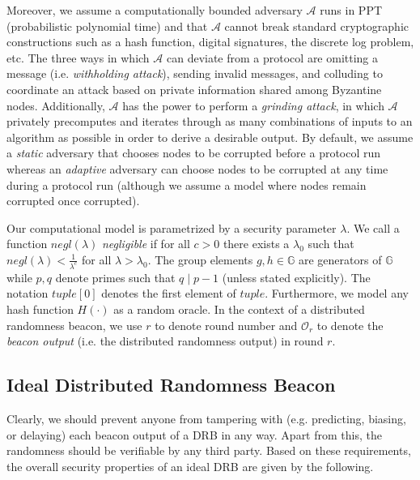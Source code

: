 \documentclass[letterpaper,twocolumn,10pt]{article}
\theoremstyle{definition}
\theoremstyle{remark}
\begin{document}
Moreover, we assume a computationally bounded adversary $\mathcal{A}$ runs in PPT (probabilistic polynomial time) and that $\mathcal{A}$ cannot break standard cryptographic constructions such as a hash function, digital signatures, the discrete log problem, etc. The three ways in which $\mathcal{A}$ can deviate from a protocol are omitting a message (i.e. \textit{withholding attack}), sending invalid messages, and colluding to coordinate an attack based on private information shared among Byzantine nodes. Additionally, $\mathcal{A}$ has the power to perform a \textit{grinding attack}, in which $\mathcal{A}$ privately precomputes and iterates through as many combinations of inputs to an algorithm as possible in order to derive a desirable output. By default, we assume a \textit{static} adversary that chooses nodes to be corrupted before a protocol run whereas an \textit{adaptive} adversary can choose nodes to be corrupted at any time during a protocol run (although we assume a model where nodes remain corrupted once corrupted).

Our computational model is parametrized by a security parameter $\lambda$. We call a function $negl(\lambda)$ \textit{negligible} if for all $c > 0$ there exists a $\lambda_0$ such that $negl(\lambda) < \frac{1}{\lambda^c}$ for all $\lambda > \lambda_0$. The group elements $g, h \in \mathbb{G}$ are generators of $\mathbb{G}$ while $p, q$ denote primes such that $q \mid p - 1$ (unless stated explicitly). The notation $tuple[0]$ denotes the first element of $tuple$. Furthermore, we model any hash function $H(\cdot)$ as a random oracle. In the context of a distributed randomness beacon, we use $r$ to denote round number and $\mathcal{O}_r$ to denote the \textit{beacon output} (i.e. the distributed randomness output) in round $r$.

\subsection{Ideal Distributed Randomness Beacon}
Clearly, we should prevent anyone from tampering with (e.g. predicting, biasing, or delaying) each beacon output of a DRB in any way. Apart from this, the randomness should be verifiable by any third party. Based on these requirements, the overall security properties of an ideal DRB are given by the following.
\end{document}
